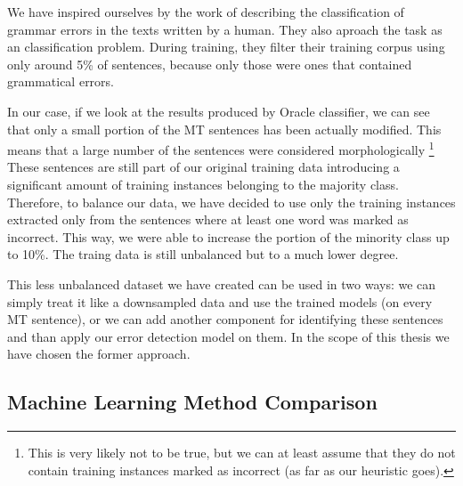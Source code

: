 We have inspired ourselves by the work of \citet{2013_Jia_CoNLL_GrammaticalError} describing the classification of grammar errors in the texts
written by a human. They also aproach the task as an classification
problem. During training, they filter their training corpus using only around 5\% of
sentences, because only those were ones that contained grammatical errors.

In our case, if we look at the results produced by Oracle classifier, we can see that
only a small portion of the MT sentences has been actually modified. This means that a large number of the sentences
were considered morphologically \footnote{This is very likely not to be true, but we can at least assume
that they do not contain training instances marked as incorrect (as far as our heuristic goes).}
These sentences are still part of our original training data introducing a significant amount of training
instances belonging to the majority class.
Therefore, to balance our data, we have decided to use only the training
instances extracted only from the sentences where at least one word was marked as incorrect. This way, we were
able to increase the portion of the minority class up to 10\%. The traing data is still unbalanced
but to a much lower degree.

This less unbalanced dataset we have created can be used in two ways: we can simply treat
it like a downsampled data and use the trained models  (on every MT sentence),
or we can add another component for identifying these  sentences
and than apply our error detection model on them. In the scope of this thesis we have chosen the former
approach.



\subsection{Machine Learning Method Comparison}

